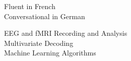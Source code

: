 \documentclass[letterpaper]{deedy-resume} %
\begin{document}
\begin{minipage}[t]{0.33\textwidth}
\sectionspace 


\textbullet{} Fluent in French \\
\textbullet{} Conversational in German

\sectionspace


\textbullet{} EEG and fMRI Recording and Analysis \\
\textbullet{} Multivariate Decoding \\
\textbullet{} Machine Learning Algorithms

\sectionspace


\end{minipage} %
\hfill
%
%
\end{document}
